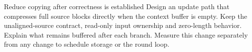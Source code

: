 \begin{MARSExercise}{Reduce copying after correctness is established}
  Design an update path that compresses full source blocks directly when the context
  buffer is empty. Keep the unaligned-source contract, read-only input ownership and
  zero-length behavior. Explain what remains buffered after each branch. Measure this
  change separately from any change to schedule storage or the round loop.
\end{MARSExercise}
